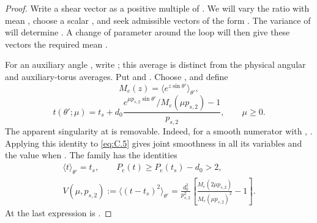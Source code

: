 \begin{proof}
Write a shear vector as a positive multiple of . We will vary the ratio  with
mean , choose a scalar , and seek admissible vectors of the form
. The
variance of  will determine . A change of parameter around the loop will then give these
vectors the required mean .

For an auxiliary angle , write
; this average is distinct from
the physical angular and auxiliary-torus averages. Put
 and
. Choose
, and define
\begin{equation}
 M_e(z)=\bigl\langle e^{z\sin\theta'}\bigr\rangle_{\theta'},
\tag{C.4}\label{eq:C.4}
\end{equation}
\begin{equation}
 t(\theta';\mu)=t_s+d_0
 \frac{e^{\mu p_{s,2}\sin\theta'}/M_e(\mu p_{s,2})-1}{p_{s,2}},
 \qquad \mu\geq0.
\tag{C.5}\label{eq:C.5}
\end{equation}
The apparent singularity at  is removable. Indeed, for a smooth numerator
 with
,
. Applying this identity to \eqref{eq:C.5} gives joint smoothness in
all its variables and the value  when
. The family has the identities
\begin{gather*}
 \langle t\rangle_{\theta'}=t_s,
 \qquad P_{\mathrm c}(t)\geq P_{\mathrm c}(t_s)-d_0>2,\\
 V(\mu,p_{s,2}):=\bigl\langle(t-t_s)^2\bigr\rangle_{\theta'}
 =\frac{d_0^2}{p_{s,2}^2}
 \left[\frac{M_e(2\mu p_{s,2})}{M_e(\mu p_{s,2})^2}-1\right].
\end{gather*}
At  the last expression is .


\end{proof}

